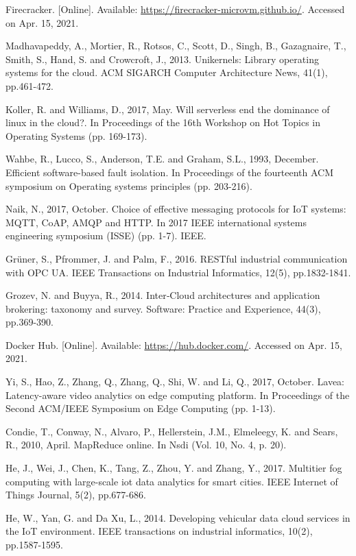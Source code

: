 \begin{thebibliography}{00}
 Firecracker. [Online]. Available: \url{https://firecracker-microvm.github.io/}. Accessed on Apr. 15, 2021.

 Madhavapeddy, A., Mortier, R., Rotsos, C., Scott, D., Singh, B., Gazagnaire, T., Smith, S., Hand, S. and Crowcroft, J., 2013. Unikernels: Library operating systems for the cloud. ACM SIGARCH Computer Architecture News, 41(1), pp.461-472.

 Koller, R. and Williams, D., 2017, May. Will serverless end the dominance of linux in the cloud?. In Proceedings of the 16th Workshop on Hot Topics in Operating Systems (pp. 169-173).

 Wahbe, R., Lucco, S., Anderson, T.E. and Graham, S.L., 1993, December. Efficient software-based fault isolation. In Proceedings of the fourteenth ACM symposium on Operating systems principles (pp. 203-216).

 Naik, N., 2017, October. Choice of effective messaging protocols for IoT systems: MQTT, CoAP, AMQP and HTTP. In 2017 IEEE international systems engineering symposium (ISSE) (pp. 1-7). IEEE.

 Grüner, S., Pfrommer, J. and Palm, F., 2016. RESTful industrial communication with OPC UA. IEEE Transactions on Industrial Informatics, 12(5), pp.1832-1841.

 Grozev, N. and Buyya, R., 2014. Inter‐Cloud architectures and application brokering: taxonomy and survey. Software: Practice and Experience, 44(3), pp.369-390.

 Docker Hub. [Online]. Available: \url{https://hub.docker.com/}. Accessed on Apr. 15, 2021.

 Yi, S., Hao, Z., Zhang, Q., Zhang, Q., Shi, W. and Li, Q., 2017, October. Lavea: Latency-aware video analytics on edge computing platform. In Proceedings of the Second ACM/IEEE Symposium on Edge Computing (pp. 1-13).

 Condie, T., Conway, N., Alvaro, P., Hellerstein, J.M., Elmeleegy, K. and Sears, R., 2010, April. MapReduce online. In Nsdi (Vol. 10, No. 4, p. 20).

 He, J., Wei, J., Chen, K., Tang, Z., Zhou, Y. and Zhang, Y., 2017. Multitier fog computing with large-scale iot data analytics for smart cities. IEEE Internet of Things Journal, 5(2), pp.677-686.

 He, W., Yan, G. and Da Xu, L., 2014. Developing vehicular data cloud services in the IoT environment. IEEE transactions on industrial informatics, 10(2), pp.1587-1595.


\end{thebibliography}
